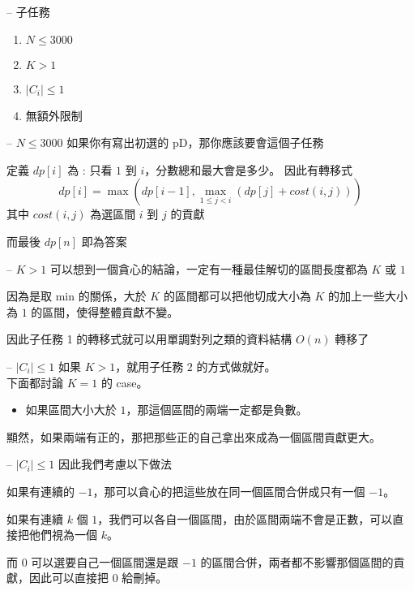 \documentclass[hyperref,UTF8,notheorems,xcolor={dvipsnames}]{beamer}
\newcommand{\btitle}[1]{{\secname} -- #1}
\theoremstyle{definition}
\begin{document}
\begin{frame}[fragile]{\btitle{子任務}}
	\begin{enumerate}
		\item $N \le 3000$
		\item $K > 1$
		\item $|C_i| \le 1$
		\item 無額外限制
	\end{enumerate}
\end{frame}

\begin{frame}[fragile]{\btitle{$N \le 3000$}}
	如果你有寫出初選的 pD，那你應該要會這個子任務
	\pause

	定義 $dp[i]$ 為 : 只看 $1$ 到 $i$，分數總和最大會是多少。  
	因此有轉移式 $$dp[i] = \max(dp[i - 1], \max_{1 \le j < i}{(dp[j] + cost(i, j))})$$
	其中 $cost(i, j)$ 為選區間 $i$ 到 $j$ 的貢獻

	而最後 $dp[n]$ 即為答案
\end{frame}

\begin{frame}[fragile]{\btitle{$K > 1$}}
	可以想到一個貪心的結論，一定有一種最佳解切的區間長度都為 $K$ 或 $1$
	\pause

	因為是取 min 的關係，大於 $K$ 的區間都可以把他切成大小為 $K$ 的加上一些大小為 $1$ 的區間，使得整體貢獻不變。

	因此子任務 1 的轉移式就可以用單調對列之類的資料結構 $O(n)$ 轉移了
\end{frame}

\begin{frame}[fragile]{\btitle{$|C_i| \le 1$}}
	如果 $K > 1$，就用子任務 $2$ 的方式做就好。 \\
	下面都討論 $K = 1$ 的 case。
	\pause

	\begin{itemize}
		\item 如果區間大小大於 $1$，那這個區間的兩端一定都是負數。 \\
	\end{itemize}
	\pause

	顯然，如果兩端有正的，那把那些正的自己拿出來成為一個區間貢獻更大。
	 


	
\end{frame}

\begin{frame}[fragile]{\btitle{$|C_i| \le 1$}}
	因此我們考慮以下做法
	
	如果有連續的 $-1$，那可以貪心的把這些放在同一個區間合併成只有一個 $-1$。
	\pause

	如果有連續 $k$ 個 $1$，我們可以各自一個區間，由於區間兩端不會是正數，可以直接把他們視為一個 $k$。
	\pause 

	而 $0$ 可以選要自己一個區間還是跟 $-1$ 的區間合併，兩者都不影響那個區間的貢獻，因此可以直接把 $0$ 給刪掉。
	
\end{frame}
\end{document}
